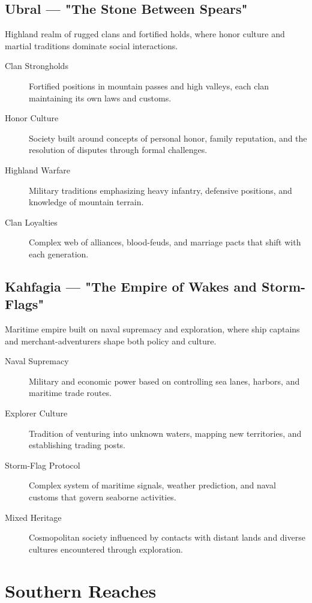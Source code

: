 \subsection*{Ubral — "The Stone Between Spears"}

Highland realm of rugged clans and fortified holds, where honor culture and martial traditions dominate social interactions.

\begin{description}
\item[Clan Strongholds] Fortified positions in mountain passes and high valleys, each clan maintaining its own laws and customs.
\item[Honor Culture] Society built around concepts of personal honor, family reputation, and the resolution of disputes through formal challenges.
\item[Highland Warfare] Military traditions emphasizing heavy infantry, defensive positions, and knowledge of mountain terrain.
\item[Clan Loyalties] Complex web of alliances, blood-feuds, and marriage pacts that shift with each generation.
\end{description}

\subsection*{Kahfagia — "The Empire of Wakes and Storm-Flags"}

Maritime empire built on naval supremacy and exploration, where ship captains and merchant-adventurers shape both policy and culture.

\begin{description}
\item[Naval Supremacy] Military and economic power based on controlling sea lanes, harbors, and maritime trade routes.
\item[Explorer Culture] Tradition of venturing into unknown waters, mapping new territories, and establishing trading posts.
\item[Storm-Flag Protocol] Complex system of maritime signals, weather prediction, and naval customs that govern seaborne activities.
\item[Mixed Heritage] Cosmopolitan society influenced by contacts with distant lands and diverse cultures encountered through exploration.
\end{description}

\section{Southern Reaches}

